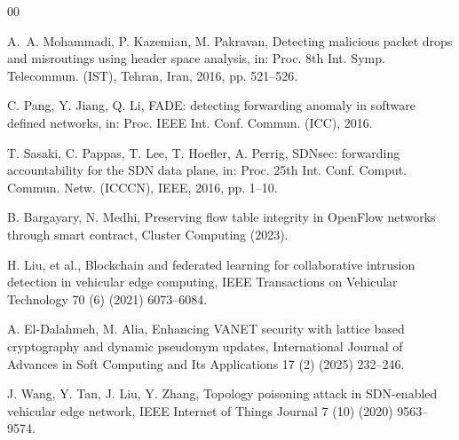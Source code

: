 \documentclass[final,5p,twocolumn]{elsarticle}
\theoremstyle{remark}
\theoremstyle{plain}
\begin{document}

\begin{thebibliography}{00}


	A.~A. Mohammadi, P. Kazemian, M. Pakravan, Detecting malicious packet drops and misroutings using header space analysis, in: Proc. 8th Int. Symp. Telecommun. (IST), Tehran, Iran, 2016, pp. 521--526.

	C. Pang, Y. Jiang, Q. Li, FADE: detecting forwarding anomaly in software defined networks, in: Proc. IEEE Int. Conf. Commun. (ICC), 2016.

	T. Sasaki, C. Pappas, T. Lee, T. Hoefler, A. Perrig, SDNsec: forwarding accountability for the SDN data plane, in: Proc. 25th Int. Conf. Comput. Commun. Netw. (ICCCN), IEEE, 2016, pp. 1--10.

	B. Bargayary, N. Medhi, Preserving flow table integrity in OpenFlow networks through smart contract, Cluster Computing (2023).

	H. Liu, et al., Blockchain and federated learning for collaborative intrusion detection in vehicular edge computing, IEEE Transactions on Vehicular Technology 70 (6) (2021) 6073--6084.

	A. El-Dalahmeh, M. Alia, Enhancing VANET security with lattice based cryptography and dynamic pseudonym updates, International Journal of Advances in Soft Computing and Its Applications 17 (2) (2025) 232--246.

	J. Wang, Y. Tan, J. Liu, Y. Zhang, Topology poisoning attack in SDN-enabled vehicular edge network, IEEE Internet of Things Journal 7 (10) (2020) 9563--9574.


\end{thebibliography}
\end{document}
